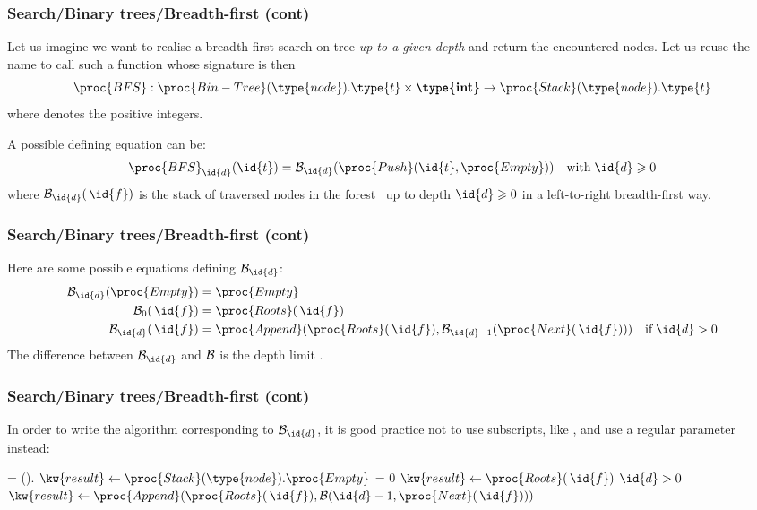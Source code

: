 %
\begin{frame}
\frametitle{Search/Binary trees/Breadth-first (cont)}

Let us imagine we want to realise a breadth-first search on tree
 \emph{up to a given depth } and return the encountered
nodes. Let us reuse the name  to call such a function whose
signature is then
\[
\proc{BFS}: \proc{Bin-Tree}(\type{node}).\type{t}
\times \textbf{\type{int}} \rightarrow
\proc{Stack}(\type{node}).\type{t}
\]
where  denotes the positive integers. 

\bigskip

A possible defining equation can be:
\[
\proc{BFS}_{\id{d}} (\id{t}) = {\cal B}_{\id{d}}
(\proc{Push} (\id{t}, \proc{Empty}))
\quad \text{with} \; \id{d} \geqslant 0
\]
where \({\cal B}_{\id{d}} (\,\id{f})\) is the stack of
traversed nodes in the forest \, up to depth \(\id{d} \geqslant
0\) in a left-to-right breadth-first way.

\end{frame}

%
\begin{frame}
\frametitle{Search/Binary trees/Breadth-first (cont)}

Here are some possible equations defining \({\cal B}_{\id{d}}\):
\begin{align*}
   {\cal B}_{\id{d}} (\proc{Empty})
&= \proc{Empty} 
& \\
   {\cal B}_{0} (\,\id{f})
&= \proc{Roots} (\,\id{f}) 
& \\
   {\cal B}_{\id{d}} (\,\id{f})
&= \proc{Append} (\proc{Roots} (\,\id{f}), {\cal B}_{\id{d}-1}
   (\proc{Next} (\,\id{f})))
& \text{if} \; \id{d} > 0
\end{align*}
The difference between \({\cal B}_{\id{d}}\) and \({\cal B}\) is
the depth limit .

\end{frame}

%
\begin{frame}
\frametitle{Search/Binary trees/Breadth-first (cont)}

In order to write the algorithm corresponding to \({\cal
  B}_{\id{d}}\), it is good practice not to use subscripts, like
, and use a regular parameter instead:
\begin{codebox}
\zi	\If {} = ().
\zi	\Then \(\kw{result} \gets
                \proc{Stack}(\type{node}).\proc{Empty}\)
\zi	\ElseIf {} = 0
\zi		\Then \(\kw{result} \gets \proc{Roots} (\,\id{f})\)
\zi		\ElseIf \(\id{d} > 0\)
\zi			\Then \(\kw{result} \gets \proc{Append}
                               (\proc{Roots} (\,\id{f}), {\cal B}
                               (\id{d}-1, \proc{Next}
                               (\,\id{f})))\)
\zi			\Else {}
\zi			\End
\zi		\End
\zi	\End
\end{codebox}

\end{frame}

